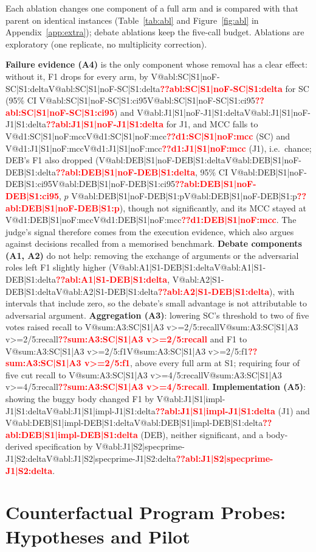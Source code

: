 \documentclass[pdflatex,iicol,sn-mathphys-num]{sn-jnl}
\makeatletter
\newcommand{\V}[1]{\ifcsname V@#1\endcsname\csname V@#1\endcsname\else\textbf{\textcolor{red}{??#1}}\fi}
\makeatother
\begin{document}
Each ablation changes one component of a full arm and is compared with that parent on identical instances (Table~\ref{tab:abl} and Figure~\ref{fig:abl} in Appendix~\ref{app:extra}); debate ablations keep the five-call budget. Ablations are exploratory (one replicate, no multiplicity correction).



\textbf{Failure evidence (A4)} is the only component whose removal has a clear effect: without it, F1 drops for every arm, by \V{abl:SC|S1|noF-SC|S1:delta} for SC (95\% CI \V{abl:SC|S1|noF-SC|S1:ci95}) and \V{abl:J1|S1|noF-J1|S1:delta} for J1, and MCC falls to \V{d1:SC|S1|noF:mcc} (SC) and \V{d1:J1|S1|noF:mcc} (J1), i.e.\ chance; DEB's F1 also dropped (\V{abl:DEB|S1|noF-DEB|S1:delta}, 95\% CI \V{abl:DEB|S1|noF-DEB|S1:ci95}, $p$ \V{abl:DEB|S1|noF-DEB|S1:p}), though not significantly, and its MCC stayed at \V{d1:DEB|S1|noF:mcc}. The judge's signal therefore comes from the execution evidence, which also argues against decisions recalled from a memorised benchmark. \textbf{Debate components (A1, A2)} do not help: removing the exchange of arguments or the adversarial roles left F1 slightly higher (\V{abl:A1|S1-DEB|S1:delta}, \V{abl:A2|S1-DEB|S1:delta}), with intervals that include zero, so the debate's small advantage is not attributable to adversarial argument. \textbf{Aggregation (A3)}: lowering SC's threshold to two of five votes raised recall to \V{sum:A3:SC|S1|A3 v>=2/5:recall} and F1 to \V{sum:A3:SC|S1|A3 v>=2/5:f1}, above every full arm at S1; requiring four of five cut recall to \V{sum:A3:SC|S1|A3 v>=4/5:recall}. \textbf{Implementation (A5)}: showing the buggy body changed F1 by \V{abl:J1|S1|impl-J1|S1:delta} (J1) and \V{abl:DEB|S1|impl-DEB|S1:delta} (DEB), neither significant, and a body-derived specification by \V{abl:J1|S2|specprime-J1|S2:delta}.

\section{Counterfactual Program Probes: Hypotheses and Pilot}\label{sec:probes}
\end{document}
